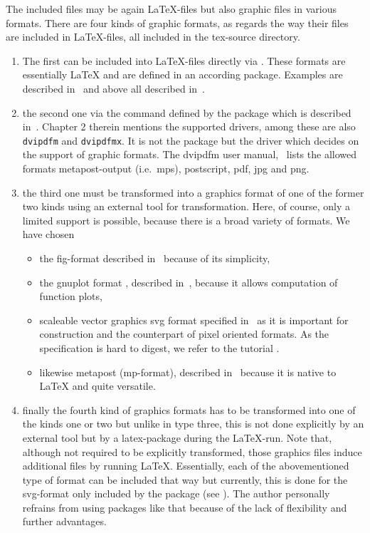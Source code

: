 \documentclass[12pt]{book}
\newcommand{\gls}[1]{#1}
\begin{document}
The included files may be again \LaTeX-files but also graphic files 
in various formats. 
There are four kinds of graphic formats, 
as regards the way their files are included in \LaTeX-files, 
all included in the tex-source directory. 
%
\begin{enumerate}
\item
The first can be included into \LaTeX-files directly via . 
These formats are essentially \LaTeX{}
and are defined in an according package. 
Examples are  described in~\cite{EEpic}
and above all  described in~\cite{TikzPGF}. 
\item
the second one via the command  
defined by the package  
which is described in~\cite{GraX}. 
Chapter 2 therein mentions the supported drivers, 
among these are also \texttt{dvipdfm} and \texttt{dvipdfmx}. 
It is not the package but the driver 
which decides on the support of graphic formats. 
The dvipdfm user manual,~\cite{DviPdfMx} lists the allowed formats 
metapost-output (i.e.~\gls{mps}), postscript, 
\gls{pdf}, \gls{jpg} and \gls{png}. 
\item\label{it:transExp}
the third one must be transformed into a graphics format 
of one of the former two kinds using an external tool for transformation. 
Here, of course, only a limited support is possible, 
because there is a broad variety of formats. 
We have chosen
%
\begin{itemize}
\item
the \gls{fig}-format described in~\cite{XFigF}
because of its simplicity, 
\item
the gnuplot format , described in~\cite{GnuPlot}, 
because it allows computation of function plots, 
\item
  scaleable vector graphics svg format specified in~\cite{Svg11} 
  as it is important for construction and the counterpart of pixel oriented
  formats.
  As the specification is hard to digest,
  we refer to the tutorial \cite{SvgTut}. 
\item
  likewise metapost (\gls{mp}-format),
  described in~\cite{MPost} because it is native to \LaTeX
  and quite versatile. 
\end{itemize}
\item\label{it:transImp}
finally the fourth kind of graphics formats 
has to be transformed into one of the kinds one or two 
but unlike in type three, this is not done explicitly 
by an external tool but by a latex-package during the \LaTeX-run. 
Note that, although not required to be explicitly transformed, 
those graphics files induce additional files 
by running \LaTeX.
Essentially, each of the abovementioned type of format
can be included that way but currently,
this is done for the \gls{svg}-format only
included by the package  (see \cite{SvgP}).
The author personally refrains from using packages like that
because of the lack of flexibility and further advantages. 
\end{enumerate}
\end{document}
